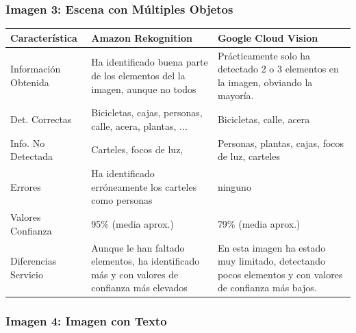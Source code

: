 \subsubsection{Imagen 3: Escena con Múltiples Objetos}

                                                                     
\begin{center}
	\renewcommand{\arraystretch}{1.2}
	\begin{tabular}{|p{5cm}|p{5cm}|p{5cm}|}
		\hline
		\textbf{Característica} & \textbf{Amazon Rekognition} & \textbf{Google Cloud Vision} \\
		\hline
		Información Obtenida & Ha identificado buena parte de los elementos del la imagen, aunque no todos & Prácticamente solo ha detectado 2 o 3 elementos en la imagen, obviando la mayoría. \\
		\hline
		Det. Correctas & Bicicletas, cajas, personas, calle, acera, plantas, ...   & Bicicletas, calle, acera \\
		\hline
		Info. No Detectada & Carteles, focos de luz,  & Personas, plantas, cajas, focos de luz, carteles\\
		\hline
		Errores & Ha identificado erróneamente los carteles como personas & ninguno \\
		\hline
		Valores Confianza & 95\% (media aprox.) & 79\% (media aprox.) \\
		\hline
		Diferencias Servicio & Aunque le han faltado elementos, ha identificado más y con valores de confianza más elevados & En esta imagen ha estado muy limitado, detectando pocos elementos y con valores de confianza más bajos. \\
		\hline
	\end{tabular}
\end{center} 

\subsubsection{Imagen 4: Imagen con Texto}


